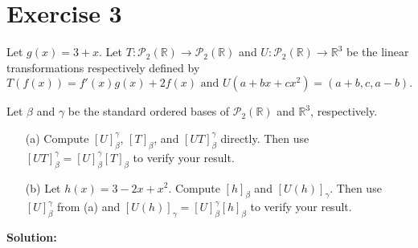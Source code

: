 \documentclass{article}
\begin{document}
\section*{Exercise 3}
Let $g(x) = 3 + x$. Let $T : \mathcal{P}_2(\mathbb{R}) \to \mathcal{P}_2(\mathbb{R})$ and $U : \mathcal{P}_2(\mathbb{R}) \to \mathbb{R}^3$ be the linear transformations respectively defined by
$$T(f(x)) = f'(x)g(x) + 2f(x) \text{ and } U(a + bx + cx^2) = (a + b, c, a - b).$$

Let $\beta$ and $\gamma$ be the standard ordered bases of $\mathcal{P}_2(\mathbb{R})$ and $\mathbb{R}^3$, respectively.

\begin{enumerate}
\item[(a)] Compute $[U]_{\beta}^{\gamma}$, $[T]_{\beta}$, and $[UT]_{\beta}^{\gamma}$ directly. Then use $[UT]_{\beta}^{\gamma} = [U]_{\beta}^{\gamma}[T]_{\beta}$ to verify your result.
\item[(b)] Let $h(x) = 3 - 2x + x^2$. Compute $[h]_{\beta}$ and $[U(h)]_{\gamma}$. Then use $[U]_{\beta}^{\gamma}$ from (a) and $[U(h)]_{\gamma} = [U]_{\beta}^{\gamma}[h]_{\beta}$ to verify your result.
\end{enumerate}

\textbf{Solution: } \\
\end{document}
